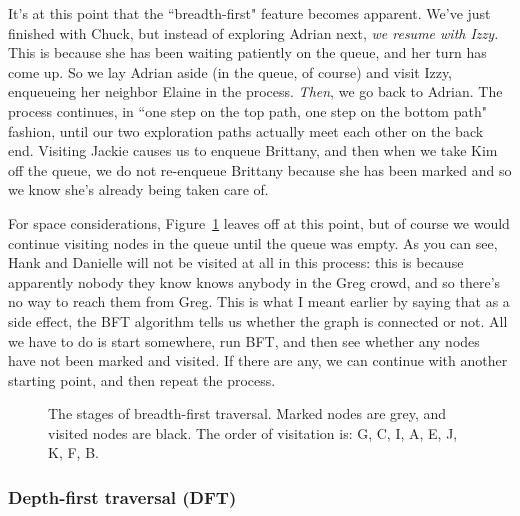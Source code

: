 It's at this point that the ``breadth-first" feature becomes apparent.
We've just finished with Chuck, but instead of exploring Adrian next,
\textit{we resume with Izzy.} This is because she has been waiting
patiently on the queue, and her turn has come up. So we lay Adrian aside
(in the queue, of course) and visit Izzy, enqueueing her neighbor Elaine in
the process. \textit{Then}, we go back to Adrian. The process continues, in
``one step on the top path, one step on the bottom path" fashion, until our
two exploration paths actually meet each other on the back end. Visiting
Jackie causes us to enqueue Brittany, and then when we take Kim off the
queue, we do not re-enqueue Brittany because she has been marked and so we
know she's already being taken care of. 

For space considerations, Figure~\ref{BFT} leaves off at this point, but of
course we would continue visiting nodes in the queue until the queue was
empty. As you can see, Hank and Danielle will not be visited at all in this
process: this is because apparently nobody they know knows anybody in the
Greg crowd, and so there's no way to reach them from Greg. This is what I
meant earlier by saying that as a side effect, the BFT algorithm tells us
whether the graph is connected or not. All we have to do is start
somewhere, run BFT, and then see whether any nodes have not been marked and
visited. If there are any, we can continue with another starting point, and
then repeat the process.


\begin{figure}[ht]
\centering
\begin{custommargins}{-1.4cm}{-1.8cm}
\caption{The stages of breadth-first traversal. Marked nodes are grey, and
visited nodes are black. The order of visitation is: G, C, I, A, E, J, K,
F, B.}
\end{custommargins}
\label{BFT}
\end{figure}

\afterpage{\clearpage}

\subsubsection{Depth-first traversal (DFT)}


